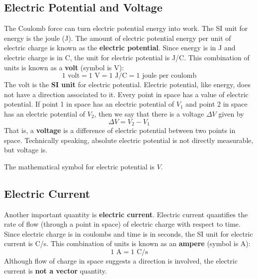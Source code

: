\subsection{Electric Potential and Voltage}
The Coulomb force can turn electric potential energy into work. The SI unit for energy is the joule (J). The amount of electric potential energy per unit of electric charge is known as the \textbf{electric potential}. Since energy is in J and electric charge is in C, the unit for electric potential is J/C. This combination of units is known as a \textbf{volt} (symbol is V):
\begin{equation}
	1 \text{ volt} = 1 \text{ V} = 1 \text{ J/C} = 1 \text{ joule per coulomb}
\end{equation}
The volt is the \textbf{SI unit} for electric potential. Electric potential, like energy, does not have a direction associated to it. Every point in space has a value of electric potential. If point 1 in space has an electric potential of $V_{1}$ and point 2 in space has an electric potential of $V_{2}$, then we say that there is a voltage $\Delta V$ given by
\begin{equation}
	\Delta V = V_{2} - V_{1}
\end{equation}
That is, a \textbf{voltage} is a difference of electric potential between two points in space. Technically speaking, absolute electric potential is not directly measurable, but voltage is.

The mathematical symbol for electric potential is $V$.
\subsection{Electric Current}
Another important quantity is \textbf{electric current}. Electric current quantifies the rate of flow (through a point in space) of electric charge with respect to time. Since electric charge is in coulombs and time is in seconds, the SI unit for electric current is C/s. This combination of units is known as an \textbf{ampere} (symbol is A):
\begin{equation}
	1 \text{ A} = 1 \text{ C/s}
\end{equation}
Although flow of charge in space suggests a direction is involved, the electric current is \textbf{not a vector} quantity.

